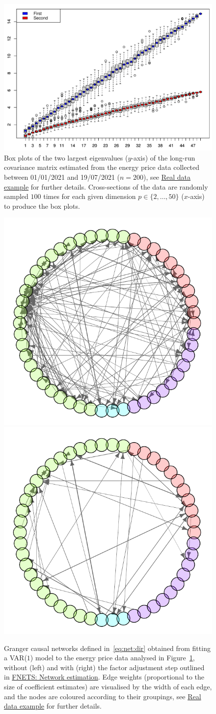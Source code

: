 \begin{figure}[htb!]
\centering
\includegraphics[width = .6\textwidth]{figs/eigplot.pdf}
\caption{Box plots of the two largest eigenvalues ($y$-axis) of the long-run covariance matrix estimated from the energy price data collected between 01/01/2021 and 19/07/2021 ($n = 200$), see \hyperref[sec:real]{Real data example} for further details.
Cross-sections of the data are randomly sampled $100$ times for each given dimension $p \in \{2, \dots, 50\}$ ($x$-axis) to produce the box plots.}
\label{fig:eigen}
\end{figure}

\begin{figure}[htb!]
\centering
\includegraphics[width = .4\textwidth]{figs/q0.pdf}
\includegraphics[width = .4\textwidth]{figs/q1.pdf}
\caption{Granger causal networks defined in~\eqref{eq:net:dir} obtained from fitting a VAR($1$) model to the energy price data analysed in Figure~\ref{fig:eigen}, without (left) and with (right) the factor adjustment step outlined in \hyperref[sec:estimation]{FNETS: Network estimation}. 
Edge weights (proportional to the size of coefficient estimates) are visualised by the width of each edge, and the nodes are coloured according to their groupings, see \hyperref[sec:real]{Real data example} for further details.}
\label{fig:q0q1}
\end{figure}

